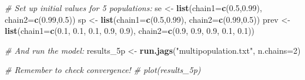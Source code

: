 \documentclass[
  ignorenonframetext,
]{beamer}
\newenvironment{Shaded}{\begin{snugshade}}{\end{snugshade}}
\newcommand{\AttributeTok}[1]{\textcolor[rgb]{0.13,0.29,0.53}{#1}}
\newcommand{\CommentTok}[1]{\textcolor[rgb]{0.56,0.35,0.01}{\textit{#1}}}
\newcommand{\DecValTok}[1]{\textcolor[rgb]{0.00,0.00,0.81}{#1}}
\newcommand{\FloatTok}[1]{\textcolor[rgb]{0.00,0.00,0.81}{#1}}
\newcommand{\FunctionTok}[1]{\textcolor[rgb]{0.13,0.29,0.53}{\textbf{#1}}}
\newcommand{\NormalTok}[1]{#1}
\newcommand{\OtherTok}[1]{\textcolor[rgb]{0.56,0.35,0.01}{#1}}
\newcommand{\StringTok}[1]{\textcolor[rgb]{0.31,0.60,0.02}{#1}}
\begin{document}
\begin{frame}[fragile]
\begin{block}{\normalsize}
\begin{Shaded}
\begin{Highlighting}[]
\CommentTok{\# Set up initial values for 5 populations:}
\NormalTok{se }\OtherTok{\textless{}{-}} \FunctionTok{list}\NormalTok{(}\AttributeTok{chain1=}\FunctionTok{c}\NormalTok{(}\FloatTok{0.5}\NormalTok{,}\FloatTok{0.99}\NormalTok{), }\AttributeTok{chain2=}\FunctionTok{c}\NormalTok{(}\FloatTok{0.99}\NormalTok{,}\FloatTok{0.5}\NormalTok{))}
\NormalTok{sp }\OtherTok{\textless{}{-}} \FunctionTok{list}\NormalTok{(}\AttributeTok{chain1=}\FunctionTok{c}\NormalTok{(}\FloatTok{0.5}\NormalTok{,}\FloatTok{0.99}\NormalTok{), }\AttributeTok{chain2=}\FunctionTok{c}\NormalTok{(}\FloatTok{0.99}\NormalTok{,}\FloatTok{0.5}\NormalTok{))}
\NormalTok{prev }\OtherTok{\textless{}{-}} \FunctionTok{list}\NormalTok{(}\AttributeTok{chain1=}\FunctionTok{c}\NormalTok{(}\FloatTok{0.1}\NormalTok{, }\FloatTok{0.1}\NormalTok{, }\FloatTok{0.1}\NormalTok{, }\FloatTok{0.9}\NormalTok{, }\FloatTok{0.9}\NormalTok{), }\AttributeTok{chain2=}\FunctionTok{c}\NormalTok{(}\FloatTok{0.9}\NormalTok{, }\FloatTok{0.9}\NormalTok{, }\FloatTok{0.9}\NormalTok{, }\FloatTok{0.1}\NormalTok{, }\FloatTok{0.1}\NormalTok{))}

\CommentTok{\# And run the model:}
\NormalTok{results\_5p }\OtherTok{\textless{}{-}} \FunctionTok{run.jags}\NormalTok{(}\StringTok{"multipopulation.txt"}\NormalTok{, }\AttributeTok{n.chains=}\DecValTok{2}\NormalTok{)}

\CommentTok{\# Remember to check convergence!}
\CommentTok{\# plot(results\_5p)}
\end{Highlighting}
\end{Shaded}

\normalsize
\end{block}
\end{frame}
\end{document}
